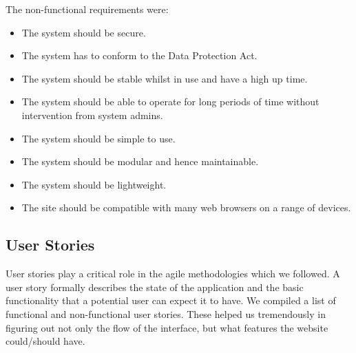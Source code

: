 \documentclass{l3proj}
\begin{document}
The non-functional requirements were:
\begin{itemize}
\item The system should be secure.
\item The system has to conform to the Data Protection Act.
\item The system should be stable whilst in use and have a high up time.
\item The system should be able to operate for long periods of time without intervention from system admins.
\item The system should be simple to use.
\item The system should be modular and hence maintainable.
\item The system should be lightweight.
\item The site should be compatible with many web browsers on a range of devices.

\end{itemize}

\subsection{User Stories}
\label{user_stories}

User stories \cite{user-story} play a critical role in the agile methodologies which we followed. A user story formally describes the state of the application and the basic functionality that a potential user can expect it to have. We compiled a list of functional and non-functional user stories. These helped us tremendously in figuring out not only the flow of the interface, but what features the website could/should have.
\end{document}
